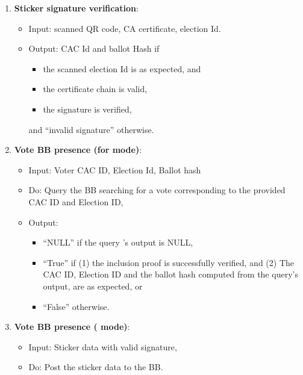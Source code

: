 \documentclass{article}
\begin{document}
\begin{enumerate}
    \item \textbf{Sticker signature verification}:
\begin{itemize}
    \item Input: scanned QR code,  CA certificate, election Id.
    \item Output: CAC Id and ballot Hash if 
    \begin{itemize}
        \item the scanned election Id is as expected, and
        \item the certificate chain is valid,
        \item the signature is verified,
    \end{itemize}
    and ``invalid signature'' otherwise.
\end{itemize}
\label{Sticker signature verification}
    \item \textbf{Vote BB presence (for \BBInclusionCheck{} mode)}:

\begin{itemize}
    \item    Input: Voter CAC ID, Election Id, Ballot hash
    \item     Do: Query the BB  searching for a vote corresponding to the provided CAC ID and Election ID,
    \item Output: 
    \begin{itemize}
        \item ``NULL'' if the query 's output is NULL,
        \item ``True'' if (1) the inclusion proof is successfully verified, and
        (2) The CAC ID, Election ID and the ballot hash computed from the query's output, are as expected, or
        \item ``False'' otherwise.
    \end{itemize}


\end{itemize}
\label{Vote BB presence-BB Inc}
    \item \textbf{Vote BB presence (\StickerBBUpload{} mode)}:
\begin{itemize}
    \item Input: Sticker data with valid signature,
    \item Do: Post the sticker data to the BB.
\end{itemize}
\label{Vote BB presence-upload}


\end{enumerate}
\end{document}
